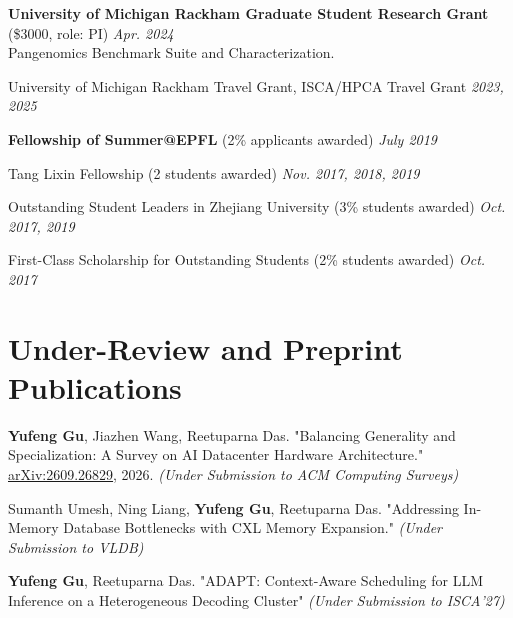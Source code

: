 \documentclass[10pt,a4paper,palatine]{moderncv}        %
\begin{document}
\textbf{University of Michigan Rackham Graduate Student Research Grant} (\$3000, role: PI) \hfill {\itshape Apr. 2024} \\
Pangenomics Benchmark Suite and Characterization.
\vspace{-2mm}

University of Michigan Rackham Travel Grant, ISCA/HPCA Travel Grant \hfill {\itshape 2023, 2025} \\
\vspace{-6mm}

\textbf{Fellowship of Summer@EPFL} (2\% applicants awarded) \hfill {\itshape July 2019} \\
\vspace{-6mm}

Tang Lixin Fellowship (2{\textperthousand} students awarded) \hfill {\itshape Nov. 2017, 2018, 2019} \\
\vspace{-6mm}

Outstanding Student Leaders in Zhejiang University (3\% students awarded) \hfill {\itshape Oct. 2017, 2019} \\
\vspace{-6mm}

First-Class Scholarship for Outstanding Students (2\% students awarded) \hfill {\itshape Oct. 2017} \\
\vspace{-5mm}



\section{Under-Review and Preprint Publications}
\vspace{-2mm} 

\textbf{Yufeng Gu}, Jiazhen Wang, Reetuparna Das. "Balancing Generality and Specialization: A Survey on AI Datacenter Hardware Architecture." \href{https://arxiv.org/abs/2609.26829}{arXiv:2609.26829}, 2026. \textit{(Under Submission to ACM Computing Surveys)}

Sumanth Umesh, Ning Liang, \textbf{Yufeng Gu}, Reetuparna Das. "Addressing In-Memory Database Bottlenecks with CXL Memory Expansion."
\textit{(Under Submission to VLDB)}

\textbf{Yufeng Gu}, Reetuparna Das. "ADAPT: Context-Aware Scheduling for LLM Inference on a Heterogeneous Decoding Cluster"
\textit{(Under Submission to ISCA'27)}
\end{document}
